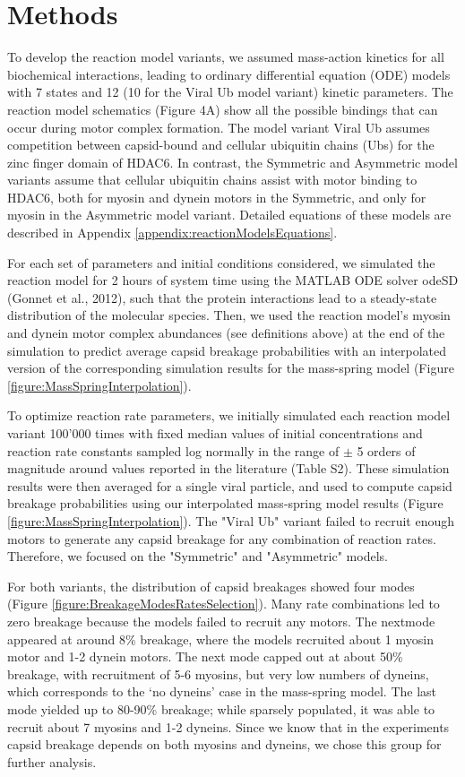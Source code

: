 \section{Methods}

To develop the reaction model variants, we assumed mass-action kinetics for all biochemical interactions, leading to ordinary differential equation (ODE) models with 7 states and 12 (10 for the Viral Ub model variant) kinetic parameters. The reaction model schematics (Figure 4A) show all the possible bindings that can occur during motor complex formation. The model variant Viral Ub assumes competition between capsid-bound and cellular ubiquitin chains (Ubs) for the zinc finger domain of HDAC6. In contrast, the Symmetric and Asymmetric model variants assume that cellular ubiquitin chains assist with motor binding to HDAC6, both for myosin and dynein motors in the Symmetric, and only for myosin in the Asymmetric model variant. Detailed equations of these models are described in Appendix \ref{appendix:reactionModelsEquations}.

For each set of parameters and initial conditions considered, we simulated the reaction model for 2 hours of system time using the MATLAB ODE solver odeSD (Gonnet et al., 2012), such that the protein interactions lead to a steady-state distribution of the molecular species. Then, we used the reaction model’s myosin and dynein motor complex abundances (see definitions above) at the end of the simulation to predict average capsid breakage probabilities with an interpolated version of the corresponding simulation results for the mass-spring model (Figure \ref{figure:MassSpringInterpolation}).

To optimize reaction rate parameters, we initially simulated each reaction model variant 100’000 times with fixed median values of initial concentrations and reaction rate constants sampled log normally in the range of $\pm$ 5 orders of magnitude around values reported in the literature (Table S2). These simulation results were then averaged for a single viral particle, and used to compute capsid breakage probabilities using our interpolated mass-spring model results (Figure \ref{figure:MassSpringInterpolation}). The "Viral Ub" variant failed to recruit enough motors to generate any capsid breakage for any combination of reaction rates. Therefore, we focused on the "Symmetric" and "Asymmetric" models.

For both variants, the distribution of capsid breakages showed four modes (Figure \ref{figure:BreakageModesRatesSelection}). Many rate combinations led to zero breakage because the models failed to recruit any motors. The nextmode appeared at around 8\% breakage, where the models recruited about 1 myosin motor and 1-2 dynein motors. The next mode capped out at about 50\% breakage, with recruitment of 5-6 myosins, but very low numbers of dyneins, which corresponds to the ‘no dyneins’ case in the mass-spring model. The last mode yielded up to 80-90\% breakage; while sparsely populated, it was able to recruit about 7 myosins and 1-2 dyneins. Since we know that in the experiments capsid breakage depends on both myosins and dyneins, we chose this group for further analysis.

